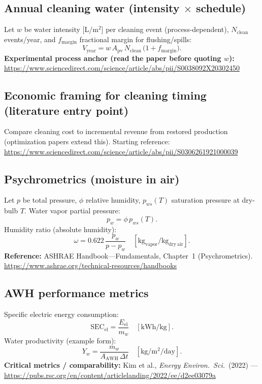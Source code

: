 \documentclass[11pt,a4paper]{article}
\begin{document}
\subsection{Annual cleaning water (intensity $\times$ schedule)}
Let $w$ be water intensity [L/m$^2$] per cleaning event (process-dependent), $N_{\mathrm{clean}}$ events/year, and $f_{\mathrm{margin}}$ fractional margin for flushing/spills:
\begin{equation}
V_{\mathrm{year}} = w\,A_{\mathrm{pv}}\,N_{\mathrm{clean}}\,\bigl(1+f_{\mathrm{margin}}\bigr).
\end{equation}
\textbf{Experimental process anchor (read the paper before quoting $w$):}\\
\url{https://www.sciencedirect.com/science/article/abs/pii/S0038092X20302450}

\subsection{Economic framing for cleaning timing (literature entry point)}
Compare cleaning cost to incremental revenue from restored production (optimization papers extend this). Starting reference:\\
\url{https://www.sciencedirect.com/science/article/abs/pii/S0306261921000039}

\subsection{Psychrometrics (moisture in air)}
Let $p$ be total pressure, $\phi$ relative humidity, $p_{ws}(T)$ saturation pressure at dry-bulb $T$. Water vapor partial pressure:
\begin{equation}
p_w = \phi\, p_{ws}(T).
\end{equation}
Humidity ratio (absolute humidity):
\begin{equation}
\omega = 0.622\,\frac{p_w}{p - p_w}
\quad [\mathrm{kg_{vapor}/kg_{dry\ air}}].
\end{equation}
\textbf{Reference:} ASHRAE Handbook---Fundamentals, Chapter~1 (Psychrometrics).\\
\url{https://www.ashrae.org/technical-resources/handbooks}

\subsection{AWH performance metrics}
Specific electric energy consumption:
\begin{equation}
\mathrm{SEC}_{\mathrm{el}} = \frac{E_{\mathrm{el}}}{m_w}
\quad [\mathrm{kWh/kg}].
\end{equation}
Water productivity (example form):
\begin{equation}
Y_w = \frac{m_w}{A_{\mathrm{AWH}}\,\Delta t}
\quad [\mathrm{kg/m^2/day}].
\end{equation}
\textbf{Critical metrics / comparability:} Kim et al., \textit{Energy Environ.\ Sci.}\ (2022) ---\\
\url{https://pubs.rsc.org/en/content/articlelanding/2022/ee/d2ee03079a}
\end{document}
